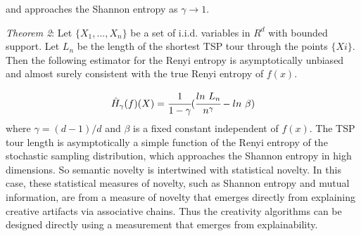 \documentclass[]{article}
\begin{document}
\noindent and approaches the Shannon entropy as $\gamma\rightarrow 1$.

\noindent\textit{Theorem 2}: Let $\{X_1,...,X_n\}$ be a set of i.i.d.  variables in $R^d$ with bounded support. Let $L_n$ be the length of the shortest TSP tour through the points $\{Xi\}$. Then the following estimator for the Renyi entropy is asymptotically unbiased and almost surely consistent with the true Renyi entropy of $f(x)$.

\begin{equation*}
    \hat{H}_\gamma(f)(X)=\cfrac{1}{1-\gamma}(\cfrac{ln\ L_n}{n^\gamma}-ln\ \beta)
\end{equation*}
where $\gamma=(d-1)/d$ and $\beta$ is a fixed constant independent of $f(x)$.
The TSP tour length is asymptotically a simple function of the Renyi entropy of the stochastic sampling distribution, which approaches the Shannon entropy in high dimensions. So semantic novelty is intertwined with statistical novelty. 
In this case, these statistical measures of novelty, such as Shannon entropy and mutual information, are from a measure of novelty that emerges directly from explaining creative artifacts via associative chains. Thus the creativity algorithms can be designed directly using a measurement that emerges from explainability.
\end{document}
